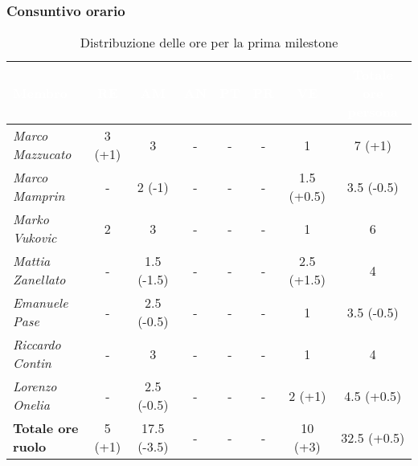 \subsubsection{Consuntivo orario}
\begin{table}[H]
    \renewcommand\arraystretch{1.5}
    \centering
    \begin{adjustwidth}{-1.15cm}{}
    \begin{tabular}{|l|c|c|c|c|c|c|c|}
    \hline
    \rowcolor[HTML]{036400}
    \textcolor{white}{\textbf{Membro}} & \multicolumn{1}{c|}{\textcolor{white}{\textbf{RE}}} & \multicolumn{1}{c|}{\textcolor{white}{\textbf{AM}}} & \multicolumn{1}{c|}{\textcolor{white}{\textbf{AN}}} & \multicolumn{1}{c|}{\textcolor{white}{\textbf{PT}}} & \multicolumn{1}{c|}{\textcolor{white}{\textbf{PR}}} & \multicolumn{1}{c|}{\textcolor{white}{\textbf{VE}}} & \multicolumn{1}{c|}{\textcolor{white}{\textbf{Totale ore persona}}} \\ \hline
    \rowcolor[HTML]{EFEFEF}\textit{Marco Mazzucato}  & 3 (+1) & 3          & - & - & - & 1         & 7 (+1)   \\ \hline
    \rowcolor[HTML]{C0C0C0}\textit{Marco Mamprin}    & -      & 2 (-1)     & - & - & - & 1.5 (+0.5)& 3.5 (-0.5) \\ \hline
    \rowcolor[HTML]{EFEFEF}\textit{Marko Vukovic}    & 2      & 3          & - & - & - & 1         & 6        \\ \hline
    \rowcolor[HTML]{C0C0C0}\textit{Mattia Zanellato} & -      & 1.5 (-1.5) & - & - & - & 2.5 (+1.5)& 4        \\ \hline
    \rowcolor[HTML]{EFEFEF}\textit{Emanuele Pase}    & -      & 2.5 (-0.5) & - & - & - & 1         & 3.5 (-0.5) \\ \hline
    \rowcolor[HTML]{C0C0C0}\textit{Riccardo Contin}  & -      & 3          & - & - & - & 1         & 4        \\ \hline
    \rowcolor[HTML]{EFEFEF}\textit{Lorenzo Onelia}   & -      & 2.5 (-0.5) & - & - & - & 2 (+1)    & 4.5 (+0.5) \\ \hline
    \rowcolor[HTML]{C0C0C0}\textbf{Totale ore ruolo} & 5 (+1) & 17.5 (-3.5)& - & - & - & 10 (+3)   & 32.5 (+0.5)\\ \hline
    \end{tabular}
    \end{adjustwidth}
    \caption{Distribuzione delle ore per la prima milestone}
\end{table}


